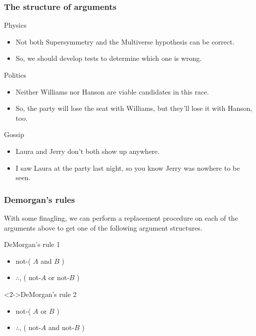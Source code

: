 \documentclass[10pt,letterpaper,xcolor=dvipsnames]{beamer}
\begin{document}
\begin{frame}
\frametitle{The structure of arguments}

\begin{block}{Physics}
  \begin{itemize}
    \item \alert<2->{Not} \alert<4->{both} Supersymmetry \alert<4->{and} the Multiverse hypothesis can be correct.
    \item So, we should develop tests to determine \alert<3->{which one} is \alert<2->{wrong}.
  \end{itemize}
\end{block}

\begin{block}{Politics}
  \begin{itemize}
    \item \alert<2->{Neither} Williams \alert<2->{nor} Hanson are viable candidates in this race.
    \item So, the party will lose the seat with Williams, \alert<4->{but} they'll lose it with Hanson, \alert<4->{too}.
  \end{itemize}
\end{block}

\begin{block}{Gossip}
  \begin{itemize}
    \item Laura \alert<4->{and} Jerry \alert<2->{don't} \alert<4->{both} show up anywhere.
    \item I saw Laura at the party last night, \alert<4->{so} you know Jerry was \alert<2->{nowhere} to be seen.
  \end{itemize}
\end{block}

\end{frame}

\begin{frame}
\frametitle{Demorgan's rules}

With some finagling, we can perform a replacement procedure on each of the arguments above to get one of the following argument structures.

\begin{block}{DeMorgan's rule 1}
  \begin{itemize}
    \item not-( $A$ and $B$ )
    \item $\therefore$, ( not-$A$ or not-$B$ )
  \end{itemize}
\end{block}

\begin{block}<2->{DeMorgan's rule 2}
  \begin{itemize}
    \item not-( $A$ or $B$ ) 
    \item $\therefore$, ( not-$A$ and not-$B$ )
  \end{itemize}
\end{block}

\end{frame}
\end{document}
